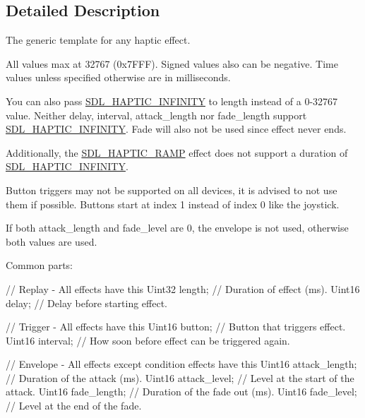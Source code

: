 \subsection{Detailed Description}
The generic template for any haptic effect. 

All values max at 32767 (0x7\+F\+FF). Signed values also can be negative. Time values unless specified otherwise are in milliseconds.

You can also pass \hyperlink{SDL__haptic_8h_a648896e9e14cb27fa8a4b6632d3f3882}{S\+D\+L\+\_\+\+H\+A\+P\+T\+I\+C\+\_\+\+I\+N\+F\+I\+N\+I\+TY} to length instead of a 0-\/32767 value. Neither delay, interval, attack\+\_\+length nor fade\+\_\+length support \hyperlink{SDL__haptic_8h_a648896e9e14cb27fa8a4b6632d3f3882}{S\+D\+L\+\_\+\+H\+A\+P\+T\+I\+C\+\_\+\+I\+N\+F\+I\+N\+I\+TY}. Fade will also not be used since effect never ends.

Additionally, the \hyperlink{SDL__haptic_8h_af10eb937a64a8f602e9c46682ac0d868}{S\+D\+L\+\_\+\+H\+A\+P\+T\+I\+C\+\_\+\+R\+A\+MP} effect does not support a duration of \hyperlink{SDL__haptic_8h_a648896e9e14cb27fa8a4b6632d3f3882}{S\+D\+L\+\_\+\+H\+A\+P\+T\+I\+C\+\_\+\+I\+N\+F\+I\+N\+I\+TY}.

Button triggers may not be supported on all devices, it is advised to not use them if possible. Buttons start at index 1 instead of index 0 like the joystick.

If both attack\+\_\+length and fade\+\_\+level are 0, the envelope is not used, otherwise both values are used.

Common parts\+: 
\begin{DoxyCode}
\textcolor{comment}{// Replay - All effects have this}
Uint32 length;        \textcolor{comment}{// Duration of effect (ms).}
Uint16 delay;         \textcolor{comment}{// Delay before starting effect.}

\textcolor{comment}{// Trigger - All effects have this}
Uint16 button;        \textcolor{comment}{// Button that triggers effect.}
Uint16 interval;      \textcolor{comment}{// How soon before effect can be triggered again.}

\textcolor{comment}{// Envelope - All effects except condition effects have this}
Uint16 attack\_length; \textcolor{comment}{// Duration of the attack (ms).}
Uint16 attack\_level;  \textcolor{comment}{// Level at the start of the attack.}
Uint16 fade\_length;   \textcolor{comment}{// Duration of the fade out (ms).}
Uint16 fade\_level;    \textcolor{comment}{// Level at the end of the fade.}
\end{DoxyCode}


